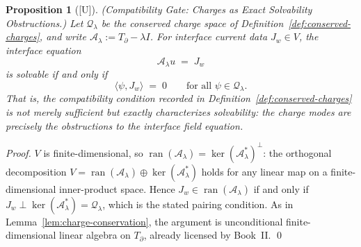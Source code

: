 \documentclass[12pt,oneside]{amsbook}
\theoremstyle{plain}
\newtheorem{proposition}[theorem]{Proposition}
\theoremstyle{definition}
\theoremstyle{remark}
\newcommand{\status}[1]{\textup{[#1]}}
\begin{document}
\begin{proposition}[\status{U}]\label{prop:charge-compatibility-gate}
\textup{(Compatibility Gate: Charges as Exact Solvability
Obstructions.)}
Let $\mathcal{Q}_\lambda$ be the conserved charge space of
Definition~\ref{def:conserved-charges}, and write
$\mathcal{A}_\lambda := T_\partial - \lambda I$.  For interface
current data $J_w \in V$, the interface equation
\[
  \mathcal{A}_\lambda u \;=\; J_w
\]
is solvable if and only if
\[
  \langle \psi, J_w \rangle \;=\; 0
  \qquad \text{for all } \psi \in \mathcal{Q}_\lambda .
\]
That is, the compatibility condition recorded in
Definition~\ref{def:conserved-charges} is not merely sufficient
but exactly characterizes solvability: the charge modes are
precisely the obstructions to the interface field equation.
\end{proposition}

\begin{proof}
$V$ is finite-dimensional, so
$\operatorname{ran}(\mathcal{A}_\lambda)
= \ker(\mathcal{A}_\lambda^{*})^{\perp}$: the orthogonal
decomposition $V = \operatorname{ran}(\mathcal{A}_\lambda) \oplus
\ker(\mathcal{A}_\lambda^{*})$ holds for any linear map on a
finite-dimensional inner-product space.  Hence
$J_w \in \operatorname{ran}(\mathcal{A}_\lambda)$ if and only if
$J_w \perp \ker(\mathcal{A}_\lambda^{*}) = \mathcal{Q}_\lambda$,
which is the stated pairing condition.  As in
Lemma~\ref{lem:charge-conservation}, the argument is unconditional
finite-dimensional linear algebra on $T_\partial$, already licensed
by Book~II. \qed
\end{proof}
\end{document}
